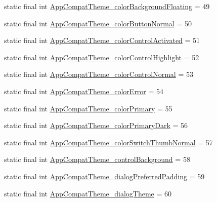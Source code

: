 \begin{DoxyCompactItemize}
\item 
static final int \mbox{\hyperlink{classcom_1_1synnapps_1_1carouselview_1_1_r_1_1styleable_a42e580536e35ae8f0133a1da0346d7b6}{App\+Compat\+Theme\+\_\+color\+Background\+Floating}} = 49
\item 
static final int \mbox{\hyperlink{classcom_1_1synnapps_1_1carouselview_1_1_r_1_1styleable_ac0141432c4e992df643abf697ef0f465}{App\+Compat\+Theme\+\_\+color\+Button\+Normal}} = 50
\item 
static final int \mbox{\hyperlink{classcom_1_1synnapps_1_1carouselview_1_1_r_1_1styleable_aceec7446210094f2d5f3f742950710f3}{App\+Compat\+Theme\+\_\+color\+Control\+Activated}} = 51
\item 
static final int \mbox{\hyperlink{classcom_1_1synnapps_1_1carouselview_1_1_r_1_1styleable_a8eb5b37a24bb23e765575a09be6517bd}{App\+Compat\+Theme\+\_\+color\+Control\+Highlight}} = 52
\item 
static final int \mbox{\hyperlink{classcom_1_1synnapps_1_1carouselview_1_1_r_1_1styleable_a061b81c55d13ba694677e4909f71b7ca}{App\+Compat\+Theme\+\_\+color\+Control\+Normal}} = 53
\item 
static final int \mbox{\hyperlink{classcom_1_1synnapps_1_1carouselview_1_1_r_1_1styleable_aa711940ccf354e374a84b7838482351e}{App\+Compat\+Theme\+\_\+color\+Error}} = 54
\item 
static final int \mbox{\hyperlink{classcom_1_1synnapps_1_1carouselview_1_1_r_1_1styleable_a71c76e2b1cd9f7836cb3704aa69a1b85}{App\+Compat\+Theme\+\_\+color\+Primary}} = 55
\item 
static final int \mbox{\hyperlink{classcom_1_1synnapps_1_1carouselview_1_1_r_1_1styleable_a875b41d8d00fa3a4dc8b4a76162b8c32}{App\+Compat\+Theme\+\_\+color\+Primary\+Dark}} = 56
\item 
static final int \mbox{\hyperlink{classcom_1_1synnapps_1_1carouselview_1_1_r_1_1styleable_ae603361ada4f0bf6f9894d86aa5e9b20}{App\+Compat\+Theme\+\_\+color\+Switch\+Thumb\+Normal}} = 57
\item 
static final int \mbox{\hyperlink{classcom_1_1synnapps_1_1carouselview_1_1_r_1_1styleable_ae6c29427a9838ed50e83aeaec0b3eeaf}{App\+Compat\+Theme\+\_\+control\+Background}} = 58
\item 
static final int \mbox{\hyperlink{classcom_1_1synnapps_1_1carouselview_1_1_r_1_1styleable_adfe05ab3fde972ea7fa5e0bfd144f47c}{App\+Compat\+Theme\+\_\+dialog\+Preferred\+Padding}} = 59
\item 
static final int \mbox{\hyperlink{classcom_1_1synnapps_1_1carouselview_1_1_r_1_1styleable_a83570a5e42b364e7acf473f87f77afab}{App\+Compat\+Theme\+\_\+dialog\+Theme}} = 60

\end{DoxyCompactItemize}
